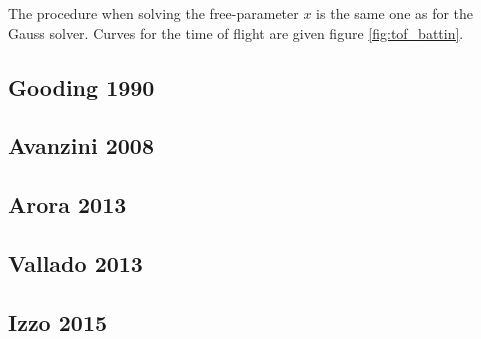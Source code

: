 The procedure when solving the free-parameter $x$ is the same one as for the
Gauss solver. Curves for the time of flight are given figure
\ref{fig:tof_battin}.


\subsection{Gooding 1990}
\subsection{Avanzini 2008}
\subsection{Arora 2013}
\subsection{Vallado 2013}
\subsection{Izzo 2015}
